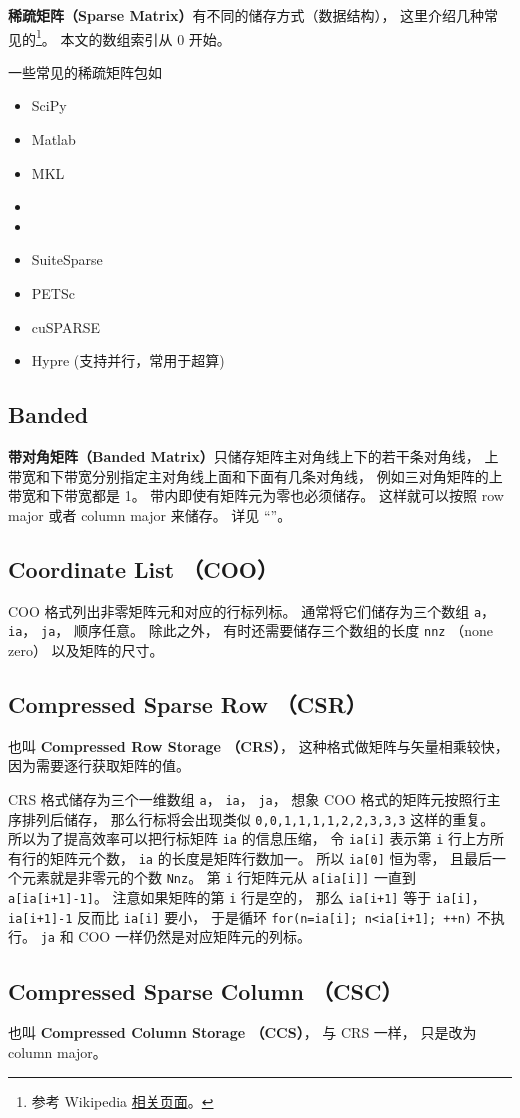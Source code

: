 
\textbf{稀疏矩阵（Sparse Matrix）}有不同的储存方式（数据结构）， 这里介绍几种常见的\footnote{参考 Wikipedia \href{https://en.wikipedia.org/wiki/Sparse_matrix}{相关页面}。}。 本文的数组索引从 0 开始。

一些常见的稀疏矩阵包如
\begin{itemize}
\item SciPy
\item Matlab
\item MKL
\item  {}
\item  {}
\item SuiteSparse
\item PETSc
\item cuSPARSE
\item Hypre (支持并行，常用于超算)




\end{itemize}


\subsection{Banded}
\textbf{带对角矩阵（Banded Matrix）}只储存矩阵主对角线上下的若干条对角线， 上带宽和下带宽分别指定主对角线上面和下面有几条对角线， 例如三对角矩阵的上带宽和下带宽都是 1。 带内即使有矩阵元为零也必须储存。 这样就可以按照 row major 或者 column major 来储存。 详见 “”。

\subsection{Coordinate List （COO）}
COO 格式列出非零矩阵元和对应的行标列标。 通常将它们储存为三个数组 \verb`a`， \verb`ia`， \verb`ja`， 顺序任意。 除此之外， 有时还需要储存三个数组的长度 \verb`nnz` （none zero） 以及矩阵的尺寸。

\subsection{Compressed Sparse Row （CSR）}\label{sub_SprMat_3}
也叫 \textbf{Compressed Row Storage （CRS）}， 这种格式做矩阵与矢量相乘较快，因为需要逐行获取矩阵的值。

CRS 格式储存为三个一维数组 \verb`a`， \verb`ia`， \verb`ja`， 想象 COO 格式的矩阵元按照行主序排列后储存， 那么行标将会出现类似 \verb`0,0,1,1,1,1,2,2,3,3,3` 这样的重复。 所以为了提高效率可以把行标矩阵 \verb`ia` 的信息压缩， 令 \verb`ia[i]` 表示第 \verb`i` 行上方所有行的矩阵元个数， \verb`ia` 的长度是矩阵行数加一。 所以 \verb`ia[0]` 恒为零， 且最后一个元素就是非零元的个数 \verb`Nnz`。 第 \verb`i` 行矩阵元从 \verb`a[ia[i]]` 一直到 \verb`a[ia[i+1]-1]`。 注意如果矩阵的第 \verb`i` 行是空的， 那么 \verb`ia[i+1]` 等于 \verb`ia[i]`， \verb`ia[i+1]-1` 反而比 \verb`ia[i]` 要小， 于是循环 \verb`for(n=ia[i]; n<ia[i+1]; ++n)` 不执行。 \verb`ja` 和 COO 一样仍然是对应矩阵元的列标。

\subsection{Compressed Sparse Column （CSC）}
也叫 \textbf{Compressed Column Storage （CCS）}， 与 CRS 一样， 只是改为 column major。
